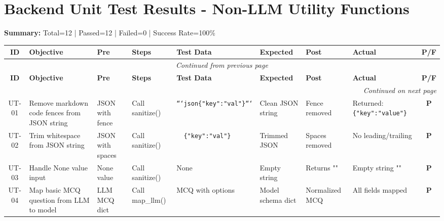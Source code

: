 \documentclass{article}
\begin{document}
\section*{Backend Unit Test Results - Non-LLM Utility Functions}

\noindent\textbf{Summary:} Total=12 | Passed=12 | Failed=0 | Success Rate=100\%

\vspace{0.3cm}

\begin{longtable}{|c|p{3.5cm}|p{1.8cm}|p{1.8cm}|p{2cm}|p{1.8cm}|p{1.8cm}|p{2cm}|c|}
\hline
\rowcolor{blue!20}
\textbf{ID} & \textbf{Objective} & \textbf{Pre} & \textbf{Steps} & \textbf{Test Data} & \textbf{Expected} & \textbf{Post} & \textbf{Actual} & \textbf{P/F} \\
\hline
\endfirsthead

\multicolumn{9}{c}{\textit{Continued from previous page}} \\
\hline
\rowcolor{blue!20}
\textbf{ID} & \textbf{Objective} & \textbf{Pre} & \textbf{Steps} & \textbf{Test Data} & \textbf{Expected} & \textbf{Post} & \textbf{Actual} & \textbf{P/F} \\
\hline
\endhead

\hline
\multicolumn{9}{r}{\textit{Continued on next page}} \\
\endfoot

\hline
\endlastfoot

UT-01 & Remove markdown code fences from JSON string & JSON with fence & Call sanitize() & \texttt{```json\{"key":"val"\}```} & Clean JSON string & Fence removed & Returned: \texttt{\{"key":"value"\}} & \cellcolor{green!40} \textbf{P} \\
\hline

UT-02 & Trim whitespace from JSON string & JSON with spaces & Call sanitize() & \texttt{\ \ \{"key":"val"\}\ \ } & Trimmed JSON & Spaces removed & No leading/trailing & \cellcolor{green!40} \textbf{P} \\
\hline

UT-03 & Handle None value input & None value & Call sanitize() & None & Empty string & Returns "" & Empty string "" & \cellcolor{green!40} \textbf{P} \\
\hline

UT-04 & Map basic MCQ question from LLM to model & LLM MCQ dict & Call map\_llm() & MCQ with options & Model schema dict & Normalized MCQ & All fields mapped & \cellcolor{green!40} \textbf{P} \\
\hline


\end{longtable}
\end{document}
